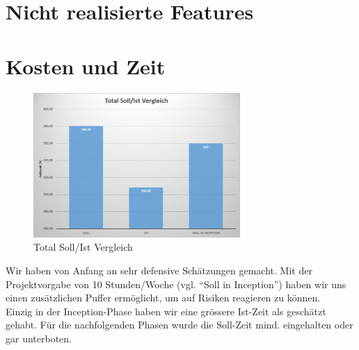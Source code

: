 	\section{Nicht realisierte Features}
	
    \newpage
	\section{Kosten und Zeit}	
        \begin{figure}
            \vspace{-25pt}
            \begin{center}
                \includegraphics[width=0.7\textwidth]{content/schlussbericht/images/zeit_total_schaetzung.png}
            \end{center}
            \vspace{-20pt}
            \caption{Total Soll/Ist Vergleich}
        \end{figure}
        Wir haben von Anfang an sehr defensive Schätzungen gemacht. Mit der Projektvorgabe von 10 Stunden/Woche (vgl. \enquote{Soll in Inception}) haben wir uns einen zusätzlichen Puffer ermöglicht, um auf Risiken reagieren zu können.
        \\ Einzig in der Inception-Phase haben wir eine grössere Ist-Zeit als geschätzt gehabt. Für die nachfolgenden Phasen wurde die Soll-Zeit mind. eingehalten oder gar unterboten. 
        \vspace{1cm}

